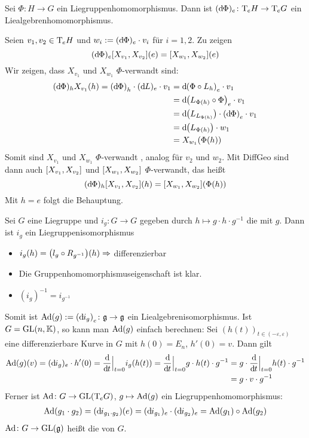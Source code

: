\begin{lemma}[label=lem:122]
	Sei $\Phi \colon H \to G$ ein Liegruppenhomomorphismus.
	Dann ist $(\mathd\Phi)_e \colon \Tmap_e H \to \Tmap_e G$ ein Liealgebrenhomomorphismus.
\end{lemma}
\begin{beweis}
	Seien $v_1,v_2 \in \Tmap_e H$ und $w_i := (\mathd \Phi)_e \cdot v_i$ für $i=1,2$.
	Zu zeigen
	\[
		(\mathd \Phi)_e \benbrace*{X_{v_1}, X_{v_2}} (e) = \benbrace*{X_{w_1},X_{w_2}}(e)
	\]
	Wir zeigen, dass $X_{v_1}$ und $X_{w_1}$ $\Phi$-verwandt sind:
	\begin{align}
		(\mathd \Phi)_h X_{v_1}(h) = \enbrace*{\mathd \Phi}_h \cdot (\mathd L)_e \cdot v_1 &= \mathd \enbrace*{\Phi \circ L_h}_e \cdot v_1 \\
		&= \mathd \enbrace*{L_{\Phi(h)} \circ \Phi}_e \cdot v_1 \\
		&= \mathd \enbrace*{L_{L_{\Phi(h)}}} \cdot \enbrace*{\mathd \Phi}_e \cdot v_1 \\
		&= \mathd \enbrace*{L_{\Phi(h)}} \cdot w_1 \\
		&= X_{w_1}(\Phi(h))
	\end{align}
	Somit sind $X_{v_1}$ und $X_{w_1}$ $\Phi$-verwandt , analog für $v_2$ und $w_2$.
	Mit DiffGeo  sind dann auch $\benbrace*{X_{v_1}, X_{v_2}}$ und $\benbrace*{X_{w_1},X_{w_2}}$ $\Phi$-verwandt, das heißt
	\[
		(\mathd \Phi)_h \benbrace*{X_{v_1},X_{v_2}}(h) = \benbrace*{X_{w_1}, X_{w_2}} \enbrace*{\Phi(h)}
	\]
	Mit $h=e$ folgt die Behauptung.
\end{beweis}

Sei $G$ eine Liegruppe und $i_g \colon G \to G$ gegeben durch $h \mapsto g \cdot h \cdot g^{-1}$ die  mit $g$.
Dann ist $i_g$ ein Liegruppenisomorphismus
\begin{itemize}
	\item $i_g(h) = \enbrace*{l_g \circ R_{g^{-1}}}(h) \Rightarrow$ differenzierbar
	\item Die Gruppenhomomorphismuseigenschaft ist klar. 
	\item $(i_g)^{-1}= i_{g^{-1}}$
\end{itemize}
Somit ist $\Ad(g) := \enbrace*{\mathd i_g}_e \colon \mathfrak{g} \to \mathfrak{g}$ ein Liealgebrenisomorphismus.
Ist $G = \GL(n,\mathbb{K})$, so kann man $\Ad(g)$ einfach berechnen:
Sei $(h(t))_{t \in (-\varepsilon,\varepsilon)}$ eine differenzierbare Kurve in $G$ mit $h(0)= E_n$, $h'(0)=v$.
Dann gilt
\begin{align}
	\Ad(g)(v)= (\mathd i_g)_e \cdot h'(0) = \diffd{}{t}\Big|_{t=0} i_g (h(t)) = \diffd{}{t}\Big|_{t=0} g \cdot h(t) \cdot g^{-1}
	&= g \cdot \diffd{}{t}\Big|_{t=0} h(t) \cdot g^{-1}\\
	&= g \cdot v \cdot g^{-1}
\end{align}
Ferner ist $\Ad \colon G \to \GL\enbrace*{\Tmap_e G}$, $g \mapsto \Ad(g)$ ein Liegruppenhomomorphismus:
\begin{align}
	\Ad(g_1 \cdot g_2) = (\mathd i_{g_1 \cdot g_2})(e) = (\mathd i_{g_1})_e \cdot (\mathd i_{g_2})_e = \Ad(g_1) \circ \Ad(g_2)
\end{align}
$\Ad \colon G \to \GL(\mathfrak{g})$ heißt die  von $G$.

